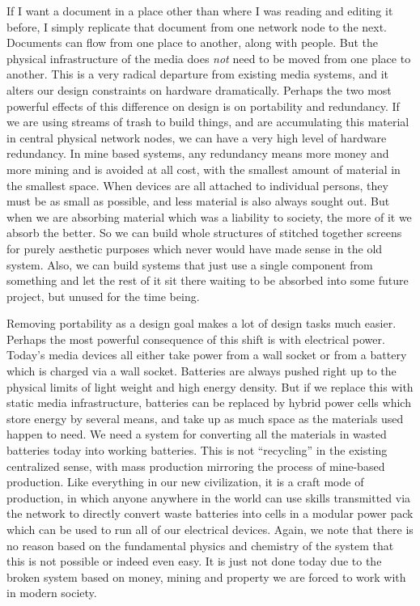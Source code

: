 If I want a document in a place other than where I was reading and editing it before, I simply replicate that document from one network node to the next.  Documents can flow from one place to another, along with people.  But the physical infrastructure of the media does \emph{not} need to be moved from one place to another.  This is a very radical departure from existing media systems, and it alters our design constraints on hardware dramatically.  Perhaps the two most powerful effects of this difference on design is on portability and redundancy.  If we are using streams of trash to build things, and are accumulating this material in central physical network nodes, we can have a very high level of hardware redundancy.  In mine based systems, any redundancy means more money and more mining and is avoided at all cost, with the smallest amount of material in the smallest space. When devices are all attached to individual persons, they must be as small as possible, and less material is also always sought out.  But when we are absorbing material which was a liability to society, the more of it we absorb the better.  So we can build whole structures of stitched together screens for purely aesthetic purposes which never would have made sense in the old system.  Also, we can build systems that just use a single component from something and let the rest of it sit there waiting to be absorbed into some future project, but unused for the time being.  

Removing portability as a design goal makes a lot of design tasks much easier. Perhaps the most powerful consequence of this shift is with electrical power.  Today's media devices all either take power from a wall socket or from a battery which is charged via a wall socket.  Batteries are always pushed right up to the physical limits of light weight and high energy density.  But if we replace this with static media infrastructure, batteries can be replaced by hybrid power cells which store energy by several means, and take up as much space as the materials used happen to need.  We need a system for converting all the materials in wasted batteries today into working batteries.  This is not ``recycling'' in the existing centralized sense, with mass production mirroring the process of mine-based production.  Like everything in our new civilization, it is a craft mode of production, in which anyone anywhere in the world can use skills transmitted via the network to directly convert waste batteries into cells in a modular power pack which can be used to run all of our electrical devices.  Again, we note that there is no reason based on the fundamental physics and chemistry of the system that this is not possible or indeed even easy.  It is just not done today due to the broken system based on money, mining and property we are forced to work with in modern society. 

